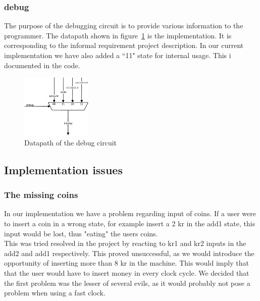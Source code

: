\subsubsection{debug}
\label{sec:debug}
The purpose of the debugging circuit is to provide various information to the programmer. The datapath shown in figure~\ref{fig:debug} is the implementation. It is corresponding to the informal requirement project description. In our current implementation we have also added a ``11" state for internal usage. This i documented in the code.
\begin{figure}
\centering
\includegraphics[width=0.3\textwidth]{fig/datapath_debug.pdf}
\caption{Datapath of the debug circuit}
\label{fig:debug}
\end{figure}

\subsection{Implementation issues}
\label{sec:implementation_issues}
\subsubsection{The missing coins}
\label{sec:missing_coins}
In our implementation we have a problem regarding input of coins. If a user were to insert a coin in a wrong state, for example insert a 2 kr in the add1 state, this input would be lost, thus "eating" the users coins.\\
This was tried resolved in the project by reacting to kr1 and kr2 inputs in the add2 and add1 respectively. This proved unsuccessful, as we would introduce the opportunity of inserting more than 8 kr in the machine. This would imply that that the user would have to insert money in every clock cycle. We decided that the first problem was the lesser of several evils, as it would probably not pose a problem when using a fast clock.